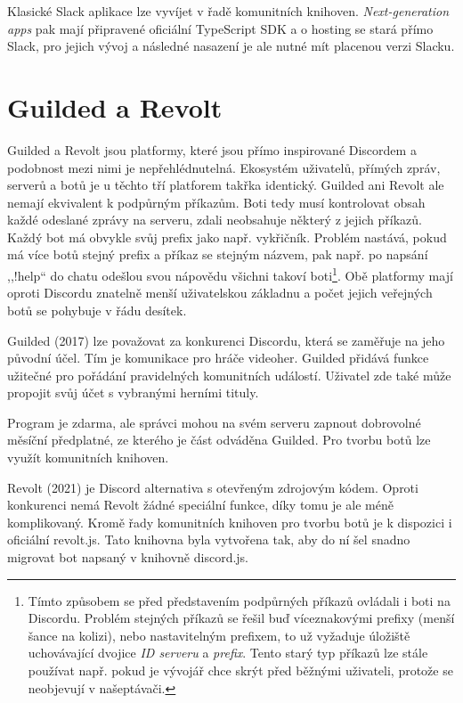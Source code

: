 \documentclass[FM]{tulthesis}
\begin{document}
	Klasické Slack aplikace lze vyvíjet v řadě komunitních knihoven. \textit{Next-generation apps} pak mají připravené oficiální \mbox{TypeScript} SDK a o hosting se stará přímo Slack, pro jejich vývoj a následné nasazení je ale nutné mít placenou verzi Slacku.
	
	\section{Guilded a Revolt}
	
	Guilded a Revolt jsou platformy, které jsou přímo inspirované Discordem a podobnost mezi nimi je nepřehlédnutelná. Ekosystém uživatelů, přímých zpráv, serverů a botů je u těchto tří platforem takřka identický. Guilded ani Revolt ale nemají ekvivalent k podpůrným příkazům. Boti tedy musí kontrolovat obsah každé odeslané zprávy na serveru, zdali neobsahuje některý z jejich příkazů. Každý bot má obvykle svůj prefix jako např. vykřičník. Problém nastává, pokud má více botů stejný prefix a příkaz se stejným názvem, pak např. po napsání ,,!help`` do chatu odešlou svou nápovědu všichni takoví boti\footnote{Tímto způsobem se před představením podpůrných příkazů ovládali i boti na Discordu. Problém stejných příkazů se řešil buď víceznakovými prefixy (menší šance na kolizi), nebo nastavitelným prefixem, to už vyžaduje úložiště uchovávající dvojice \textit{ID serveru} a \textit{prefix}. Tento starý typ příkazů lze stále používat např. pokud je vývojář chce skrýt před běžnými uživateli, protože se neobjevují v našeptávači.}. Obě platformy mají oproti Discordu znatelně menší uživatelskou základnu a počet jejich veřejných botů se pohybuje v řádu desítek.
	
	Guilded (2017) lze považovat za konkurenci Discordu, která se zaměřuje na jeho původní účel. Tím je komunikace pro hráče videoher. Guilded přidává funkce užitečné pro pořádání pravidelných komunitních událostí. Uživatel zde také může propojit svůj účet s vybranými herními tituly. \cite{web_guilded} 
	
	Program je zdarma, ale správci mohou na svém serveru zapnout dobrovolné měsíční předplatné, ze kterého je část odváděna Guilded. Pro tvorbu botů lze využít komunitních knihoven.
	
	Revolt (2021) je Discord alternativa s otevřeným zdrojovým kódem. Oproti konkurenci nemá Revolt žádné speciální funkce, díky tomu je ale méně komplikovaný. Kromě řady komunitních knihoven pro tvorbu botů je k dispozici i oficiální revolt.js. Tato knihovna byla vytvořena tak, aby do ní šel snadno migrovat bot napsaný v knihovně discord.js.
	
\end{document}
